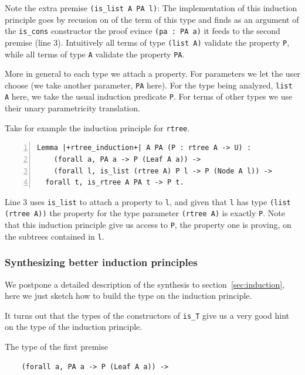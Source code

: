 \documentclass[sigplan,10pt,review]{acmart}\settopmatter{printfolios=true,printccs=false,printacmref=false}
\begin{document}
\noindent
Note the extra premise \lstinline+(is_list A PA l)+: The
implementation of this induction principle
goes by recusion on of the term of this type and finds
as an argument of the \lstinline+is_cons+ constructor
the proof evince \lstinline+(pa : PA a)+ it feeds to the second premise
(line 3). Intuitively all terms of type \lstinline+(list A)+
validate the property \lstinline+P+, while all terms of type
\lstinline+A+ validate the property \lstinline+PA+.

More in general to each type we attach a property. For parameters we
let the user choose (we take another parameter, \lstinline+PA+ here).
For the type being analyzed, \lstinline+list A+ here, we take the
usual induction predicate \lstinline+P+.
For terms of other types we use their unary parametricity translation.

Take for example the induction principle for \lstinline+rtree+.

\begin{minipage}{\textwidth}\begin{lstlisting}[numbers=left]
Lemma |+rtree_induction+| A PA (P : rtree A -> U) :
    (forall a, PA a -> P (Leaf A a)) ->
    (forall l, is_list (rtree A) P l -> P (Node A l)) ->
  forall t, is_rtree A PA t -> P t.
\end{lstlisting}\end{minipage}

\noindent
Line 3 uses \lstinline+is_list+ to attach a property to \lstinline+l+,
and given that \lstinline+l+ has type \lstinline+(list (rtree A))+
the property for the type parameter \lstinline+(rtree A)+ is
exactly \lstinline+P+.
Note that this induction principle give us access to \lstinline+P+, the
property one is proving, on the subtrees contained in \lstinline+l+.

\subsubsection{Synthesizing better induction principles} %

We postpone a detailed description of the synthesis to
section~\ref{sec:induction}, here we just sketch how to
build the type on the induction principle.

It turns out that the types of the constructors of
\lstinline+is_T+ give us a very good hint on the type
of the induction principle.

The type of the first premise

\begin{minipage}{\textwidth}\begin{lstlisting}
    (forall a, PA a -> P (Leaf A a)) ->
\end{lstlisting}\end{minipage}
\end{document}
